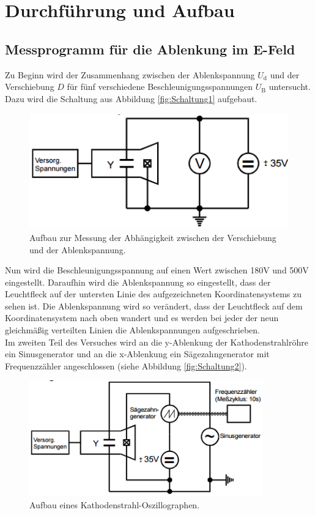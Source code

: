 \section{Durchführung und Aufbau}
\label{sec:Durchführung}
\subsection{Messprogramm für die Ablenkung im E-Feld}
Zu Beginn wird der Zusammenhang zwischen der Ablenkspannung $U_\text{d}$ und der Verschiebung $D$ für fünf verschiedene Beschleunigungsspannungen $U_\text{B}$ untersucht. Dazu wird die Schaltung aus Abbildung \eqref{fig:Schaltung1} aufgebaut.

\begin{figure}[H]
  \centering
  \includegraphics[height=5cm]{picture/Schaltung1}
  \caption{Aufbau zur Messung der Abhängigkeit zwischen der Verschiebung und der Ablenkspannung. \cite[5]{V501}}
  \label{fig:Schaltung1}
\end{figure}

Nun wird die Beschleunigungsspannung auf einen Wert zwischen 180V und 500V eingestellt. Daraufhin wird die Ablenkspannung so eingestellt, dass der Leuchtfleck auf der untersten Linie des aufgezeichneten Koordinatensystems zu sehen ist. Die Ablenkspannung wird so verändert, dass der Leuchtfleck auf dem Koordinatensystem nach oben wandert und es werden bei jeder der neun gleichmäßig verteilten Linien die Ablenkspannungen aufgeschrieben. \\
Im zweiten Teil des Versuches wird an die y-Ablenkung der Kathodenstrahlröhre ein Sinusgenerator und an die x-Ablenkung ein Sägezahngenerator mit Frequenzzähler angeschlossen (siehe Abbildung \eqref{fig:Schaltung2}).

\begin{figure}[H]
  \centering
  \includegraphics[height=5cm]{picture/Schaltung2}
  \caption{Aufbau eines Kathodenstrahl-Oszillographen. \cite[5]{V501}}
  \label{fig:Schaltung2}
\end{figure}

